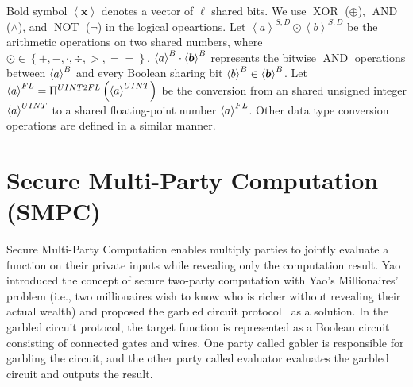 Bold symbol $\left\langle \boldsymbol{x}\right\rangle $ denotes a vector of $\ell$ shared bits.
We use $\operatorname{XOR}$ ($\oplus $), $\operatorname{AND}$ ($\land $), and $\operatorname{NOT}$ ($\neg$) in the logical opeartions.
Let $\left\langle {a}\right\rangle^{S,D} \odot \left\langle {b}\right\rangle^{S,D}$ be the arithmetic operations on two shared numbers, where $\odot\in\left\{+, -, \cdot, \div, >, ==\right\} $. $\left\langle a\right\rangle ^{B} \cdot \left\langle \boldsymbol{b}\right\rangle ^{B}$ represents the bitwise $\operatorname{AND}$ operations between $\left\langle a\right\rangle ^{B}$ and every Boolean sharing bit $\left\langle b\right\rangle^{B} \in\left\langle \boldsymbol{b}\right\rangle ^{B}$.
Let $\left\langle {a}\right\rangle ^{FL}=\Uppi^{UINT2FL}\left(\left\langle {a}\right\rangle ^{UINT}\right) $ be the conversion from an shared unsigned integer $\left\langle {a}\right\rangle ^{UINT}$ to a shared floating-point number $\left\langle {a}\right\rangle ^{FL}$. Other data type conversion operations are defined in a similar manner.


\section{Secure Multi-Party Computation (SMPC)}
\label{sec:secureMultipartyComputation}
Secure Multi-Party Computation enables multiply parties to jointly evaluate a function on their private inputs while revealing only the computation result. Yao~\cite{yao1982protocols} introduced the concept of secure two-party computation with Yao's Millionaires' problem (i.e., two millionaires wish to know who is richer without revealing their actual wealth) and proposed the garbled circuit protocol~\cite{yao1986generate} as a solution.
In the garbled circuit protocol, the target function is represented as a Boolean circuit consisting of connected gates and wires. One party called gabler is responsible for garbling the circuit, and the other party called evaluator evaluates the garbled circuit and outputs the result.

